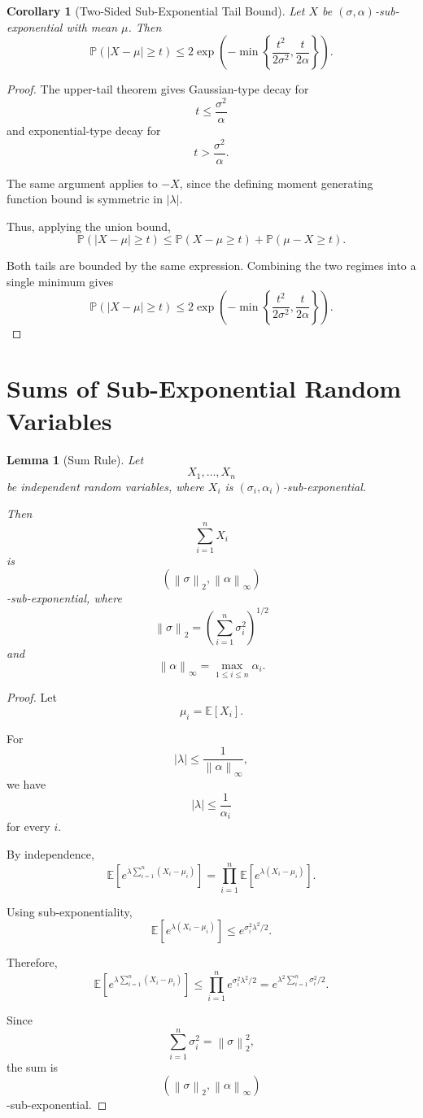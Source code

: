 \documentclass[12pt,oneside]{book}
\numberwithin{equation}{section}
\theoremstyle{definition}
\theoremstyle{plain}
\newtheorem{lemma}{Lemma}[section]
\newtheorem{corollary}{Corollary}[section]
\theoremstyle{remark}
\newcommand{\E}{\mathbb{E}}
\newcommand{\Prob}{\mathbb{P}}
\newcommand{\norm}[1]{\left\lVert #1 \right\rVert}
\begin{document}
\begin{corollary}[Two-Sided Sub-Exponential Tail Bound]
Let $X$ be $(\sigma,\alpha)$-sub-exponential with mean $\mu$. Then
\[
\Prob(|X-\mu|\geq t)
\leq
2\exp\left(
-\min\left\{
\frac{t^2}{2\sigma^2},
\frac{t}{2\alpha}
\right\}
\right).
\]
\end{corollary}

\begin{proof}
The upper-tail theorem gives Gaussian-type decay for
\[
t\leq \frac{\sigma^2}{\alpha}
\]
and exponential-type decay for
\[
t> \frac{\sigma^2}{\alpha}.
\]

The same argument applies to $-X$, since the defining moment generating function bound is symmetric in $|\lambda|$.

Thus, applying the union bound,
\[
\Prob(|X-\mu|\geq t)
\leq
\Prob(X-\mu\geq t)
+
\Prob(\mu-X\geq t).
\]

Both tails are bounded by the same expression. Combining the two regimes into a single minimum gives
\[
\Prob(|X-\mu|\geq t)
\leq
2\exp\left(
-\min\left\{
\frac{t^2}{2\sigma^2},
\frac{t}{2\alpha}
\right\}
\right).
\]
\end{proof}

\section{Sums of Sub-Exponential Random Variables}

\begin{lemma}[Sum Rule]
Let
\[
X_1,\dots,X_n
\]
be independent random variables, where $X_i$ is $(\sigma_i,\alpha_i)$-sub-exponential.

Then
\[
\sum_{i=1}^n X_i
\]
is
\[
\left(
\norm{\sigma}_2,
\norm{\alpha}_\infty
\right)
\]
-sub-exponential, where
\[
\norm{\sigma}_2
=
\left(
\sum_{i=1}^n \sigma_i^2
\right)^{1/2}
\]
and
\[
\norm{\alpha}_\infty
=
\max_{1\leq i\leq n}\alpha_i.
\]
\end{lemma}

\begin{proof}
Let
\[
\mu_i=\E[X_i].
\]

For
\[
|\lambda|\leq \frac{1}{\norm{\alpha}_\infty},
\]
we have
\[
|\lambda|\leq \frac{1}{\alpha_i}
\]
for every $i$.

By independence,
\[
\E\left[
e^{\lambda\sum_{i=1}^n (X_i-\mu_i)}
\right]
=
\prod_{i=1}^n
\E\left[
e^{\lambda(X_i-\mu_i)}
\right].
\]

Using sub-exponentiality,
\[
\E\left[
e^{\lambda(X_i-\mu_i)}
\right]
\leq
e^{\sigma_i^2\lambda^2/2}.
\]

Therefore,
\[
\E\left[
e^{\lambda\sum_{i=1}^n (X_i-\mu_i)}
\right]
\leq
\prod_{i=1}^n
e^{\sigma_i^2\lambda^2/2}
=
e^{\lambda^2\sum_{i=1}^n\sigma_i^2/2}.
\]

Since
\[
\sum_{i=1}^n\sigma_i^2
=
\norm{\sigma}_2^2,
\]
the sum is
\[
\left(
\norm{\sigma}_2,
\norm{\alpha}_\infty
\right)
\]
-sub-exponential.
\end{proof}
\end{document}
